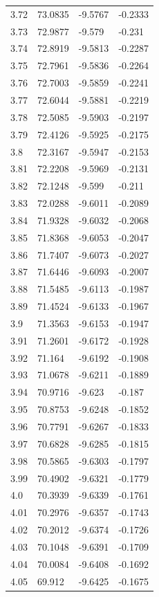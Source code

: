 \begin{tabular}{llll}
3.72 & 73.0835 & -9.5767 & -0.2333 \\
3.73 & 72.9877 & -9.579 & -0.231 \\
3.74 & 72.8919 & -9.5813 & -0.2287 \\
3.75 & 72.7961 & -9.5836 & -0.2264 \\
3.76 & 72.7003 & -9.5859 & -0.2241 \\
3.77 & 72.6044 & -9.5881 & -0.2219 \\
3.78 & 72.5085 & -9.5903 & -0.2197 \\
3.79 & 72.4126 & -9.5925 & -0.2175 \\
3.8 & 72.3167 & -9.5947 & -0.2153 \\
3.81 & 72.2208 & -9.5969 & -0.2131 \\
3.82 & 72.1248 & -9.599 & -0.211 \\
3.83 & 72.0288 & -9.6011 & -0.2089 \\
3.84 & 71.9328 & -9.6032 & -0.2068 \\
3.85 & 71.8368 & -9.6053 & -0.2047 \\
3.86 & 71.7407 & -9.6073 & -0.2027 \\
3.87 & 71.6446 & -9.6093 & -0.2007 \\
3.88 & 71.5485 & -9.6113 & -0.1987 \\
3.89 & 71.4524 & -9.6133 & -0.1967 \\
3.9 & 71.3563 & -9.6153 & -0.1947 \\
3.91 & 71.2601 & -9.6172 & -0.1928 \\
3.92 & 71.164 & -9.6192 & -0.1908 \\
3.93 & 71.0678 & -9.6211 & -0.1889 \\
3.94 & 70.9716 & -9.623 & -0.187 \\
3.95 & 70.8753 & -9.6248 & -0.1852 \\
3.96 & 70.7791 & -9.6267 & -0.1833 \\
3.97 & 70.6828 & -9.6285 & -0.1815 \\
3.98 & 70.5865 & -9.6303 & -0.1797 \\
3.99 & 70.4902 & -9.6321 & -0.1779 \\
4.0 & 70.3939 & -9.6339 & -0.1761 \\
4.01 & 70.2976 & -9.6357 & -0.1743 \\
4.02 & 70.2012 & -9.6374 & -0.1726 \\
4.03 & 70.1048 & -9.6391 & -0.1709 \\
4.04 & 70.0084 & -9.6408 & -0.1692 \\
4.05 & 69.912 & -9.6425 & -0.1675 \\

\end{tabular}
